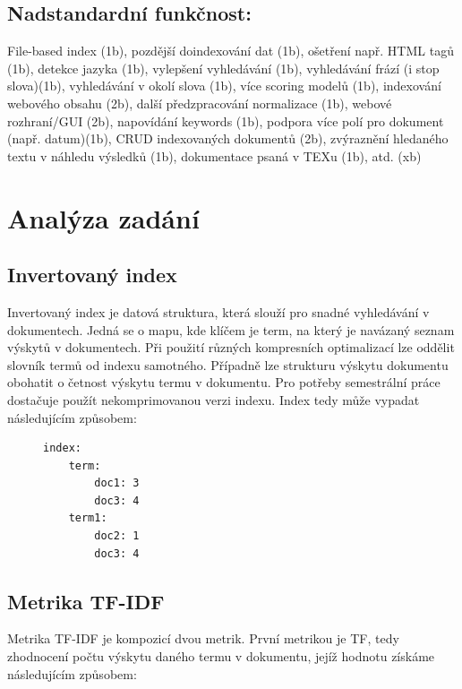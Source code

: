\documentclass[12pt, a4paper]{article}
\begin{document}
\subsection{Nadstandardní funkčnost:}

File-based index (1b), pozdější doindexování dat (1b), ošetření např. HTML tagů (1b), detekce jazyka (1b), vylepšení vyhledávání (1b), vyhledávání frází (i stop slova)(1b), vyhledávání v okolí slova (1b), více scoring modelů (1b),  indexování webového obsahu (2b), další předzpracování normalizace (1b), webové rozhraní/GUI (2b), napovídání keywords (1b), podpora více polí pro dokument (např. datum)(1b), CRUD indexovaných dokumentů (2b), zvýraznění hledaného textu v náhledu výsledků (1b), dokumentace psaná v TEXu (1b), atd. (xb)


\newpage

\section{Analýza zadání}

\subsection{Invertovaný index}

Invertovaný index je datová struktura, která slouží pro snadné vyhledávání v dokumentech. Jedná se o mapu, kde klíčem je term, na který je navázaný seznam výskytů v dokumentech. Při použití různých kompresních optimalizací lze oddělit slovník termů od indexu samotného. Případně lze strukturu výskytu dokumentu obohatit o četnost výskytu termu v dokumentu. Pro potřeby semestrální práce dostačuje použít nekomprimovanou verzi indexu. Index tedy může vypadat následujícím způsobem:

\begin{figure}[ht!]
\centering
\begin{BVerbatim}
index:
    term:
        doc1: 3
        doc3: 4
    term1:
        doc2: 1
        doc3: 4
\end{BVerbatim}
\end{figure}


\subsection{Metrika TF-IDF}

Metrika TF-IDF je kompozicí dvou metrik. První metrikou je TF, tedy zhodnocení počtu výskytu daného termu v dokumentu, jejíž hodnotu získáme následujícím způsobem:
\end{document}
